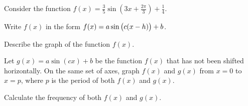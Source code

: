 \documentclass[a4paper,oneside,12pt]{article}
\begin{document}
\begin{exercise}
Consider the function
$f(x) = \frac{3}{5} \sin(3x + \frac{2\pi}{3}) + \frac{1}{4}$.
\begin{packedenum}
\item\label{subex:trigonometric:sin_left_shift_2pi_9_standard_form}
  Write $f(x)$ in the form $f(x) = a \sin\big(c (x - h)\big) + b$.

\item\label{subex:trigonometric:sin_left_shift_2pi_9_describe}
  Describe the graph of the function $f(x)$.

\item\label{subex:trigonometric:sin_left_shift_2pi_9_graph}
  Let $g(x) = a \sin(cx) + b$ be the function $f(x)$ that has not been
  shifted horizontally.  On the same set of axes, graph $f(x)$ and
  $g(x)$ from $x = 0$ to $x = p$, where $p$ is the period of both
  $f(x)$ and $g(x)$.

\item\label{subex:trigonometric:sin_left_shift_2pi_9_frequency}
  Calculate the frequency of both $f(x)$ and $g(x)$.
\end{packedenum}
\end{exercise}
\end{document}
